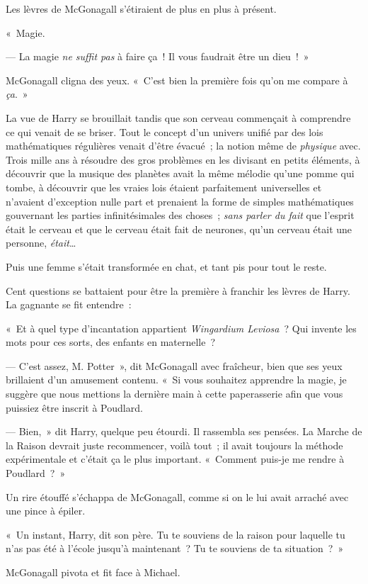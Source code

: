Les lèvres de McGonagall s'étiraient de plus en plus à présent.

«~Magie.

--- La magie \emph{ne suffit pas} à faire ça~! Il vous faudrait être un dieu~!~»

McGonagall cligna des yeux. «~C'est bien la première fois qu'on me compare à \emph{ça}.~»

La vue de Harry se brouillait tandis que son cerveau commençait à comprendre ce qui venait de se briser. Tout le concept d'un univers unifié par des lois mathématiques régulières venait d'être évacué~; la notion même de \emph{physique} avec. Trois mille ans à résoudre des gros problèmes en les divisant en petits éléments, à découvrir que la musique des planètes avait la même mélodie qu'une pomme qui tombe, à découvrir que les vraies lois étaient parfaitement universelles et n'avaient d'exception nulle part et prenaient la forme de simples mathématiques gouvernant les parties infinitésimales des choses~; \emph{sans parler du fait} que l'esprit était le cerveau et que le cerveau était fait de neurones, qu'un cerveau était une personne, \emph{était}…

Puis une femme s'était transformée en chat, et tant pis pour tout le reste.

Cent questions se battaient pour être la première à franchir les lèvres de Harry. La gagnante se fit entendre~:

«~Et à quel type d'incantation appartient \emph{Wingardium Leviosa}~? Qui invente les mots pour ces sorts, des enfants en maternelle~?

--- C'est assez, M. Potter~», dit McGonagall avec fraîcheur, bien que ses yeux brillaient d'un amusement contenu. «~Si vous souhaitez apprendre la magie, je suggère que nous mettions la dernière main à cette paperasserie afin que vous puissiez être inscrit à Poudlard.

--- Bien,~» dit Harry, quelque peu étourdi. Il rassembla ses pensées. La Marche de la Raison devrait juste recommencer, voilà tout~; il avait toujours la méthode expérimentale et c'était ça le plus important. «~Comment puis-je me rendre à Poudlard~?~»

Un rire étouffé s'échappa de McGonagall, comme si on le lui avait arraché avec une pince à épiler.

«~Un instant, Harry, dit son père. Tu te souviens de la raison pour laquelle tu n'as pas été à l'école jusqu'à maintenant~? Tu te souviens de ta situation~?~»

McGonagall pivota et fit face à Michael.

